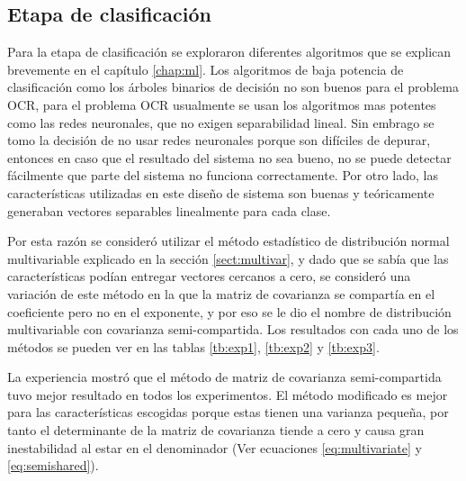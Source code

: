 \documentclass[a4paper, 11pt, oneside]{report}
\begin{document}
\subsection{Etapa de clasificación}
Para la etapa de clasificación se exploraron diferentes algoritmos que se explican brevemente en el capítulo \ref{chap:ml}. Los algoritmos de baja potencia de clasificación como los árboles binarios de decisión no son buenos para el problema OCR, para el problema OCR usualmente se usan los algoritmos mas potentes como las redes neuronales, que no exigen separabilidad lineal. Sin embrago se tomo la decisión de no usar redes neuronales porque son difíciles de depurar, entonces en caso que el resultado del sistema no sea bueno, no se puede detectar fácilmente que parte del sistema no funciona correctamente. Por otro lado, las características utilizadas en este diseño de sistema son buenas y teóricamente generaban vectores separables linealmente para cada clase.

Por esta razón se consideró utilizar el método estadístico de distribución normal multivariable explicado en la sección \ref{sect:multivar}, y dado que se sabía que las características podían entregar vectores cercanos a cero, se consideró una variación de este método en la que la matriz de covarianza se compartía en el coeficiente pero no en el exponente, y por eso se le dio el nombre de distribución multivariable con covarianza semi-compartida. Los resultados con cada uno de los métodos se pueden ver en las tablas \ref{tb:exp1}, \ref{tb:exp2} y \ref{tb:exp3}.

La experiencia mostró que el método de matriz de covarianza semi-compartida tuvo mejor resultado en todos los experimentos. El método modificado es mejor para las características escogidas porque estas tienen una varianza pequeña, por tanto el determinante de la matriz de covarianza tiende a cero y causa gran inestabilidad al estar en el denominador (Ver ecuaciones \ref{eq:multivariate} y \ref{eq:semishared}).
\end{document}
